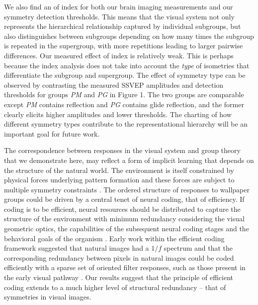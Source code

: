 \documentclass[11pt, twoside]{article}
\begin{document}
We also find an of index for both our brain imaging measurements and our symmetry detection thresholds. This means that the visual system not only represents the hierarchical relationship captured by individual subgroups, but also distinguishes between subgroups depending on how many times the subgroup is repeated in the supergroup, with more repetitions leading to larger pairwise differences. Our measured effect of index is relatively weak. This is perhaps because the index analysis does not take into account the \textit{type} of isometries that differentiate the subgroup and supergroup. The effect of symmetry type can be observed by contrasting the measured SSVEP amplitudes and detection thresholds for groups \textit{PM} and \textit{PG} in Figure 1. The two groups are comparable except \textit{PM} contains reflection and \textit{PG} contains glide reflection, and the former clearly elicits higher amplitudes and lower thresholds. The charting of how different symmetry types contribute to the representational hierarchy will be an important goal for future work.

The correspondence between responses in the visual system and group theory that we demonstrate here, may reflect a form of implicit learning that depends on the structure of the natural world. The environment is itself constrained by physical forces underlying pattern formation and these forces are subject to multiple symmetry constraints \cite{RN1634}. The ordered structure of responses to wallpaper groups could be driven by a central tenet of neural coding, that of efficiency. If coding is to be efficient, neural resources should be distributed to capture the structure of the environment with minimum redundancy considering the visual geometric optics, the capabilities of the subsequent neural coding stages and the behavioral goals of the organism \cite{RN1758, RN1760, RN1757, RN1756}. Early work within the efficient coding framework suggested that natural images had a $1/f$ spectrum and that the corresponding redundancy between pixels in natural images could be coded efficiently with a sparse set of oriented filter responses, such as those present in the early visual pathway \cite{RN1740, RN1446}. Our results suggest that the principle of efficient coding extends to a much higher level of structural redundancy – that of symmetries in visual images. 
\end{document}
